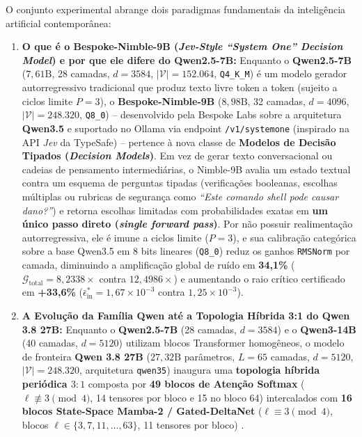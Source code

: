 \documentclass[11pt,a4paper]{article}
\theoremstyle{definition}
\begin{document}
O conjunto experimental abrange dois paradigmas fundamentais da inteligência artificial contemporânea:
\begin{enumerate}
    \item \textbf{O que é o Bespoke-Nimble-9B (\textit{Jev-Style ``System One'' Decision Model}) e por que ele difere do Qwen2.5-7B:} Enquanto o \textbf{Qwen2.5-7B} ($7{,}61\text{B}$, 28 camadas, $d=3584$, $|\mathcal{V}|=152.064$, \texttt{Q4\_K\_M}) é um modelo gerador autorregressivo tradicional que produz texto livre token a token (sujeito a ciclos limite $P=3$), o \textbf{Bespoke-Nimble-9B} ($8{,}98\text{B}$, 32 camadas, $d=4096$, $|\mathcal{V}|=248.320$, \texttt{Q8\_0}) -- desenvolvido pela Bespoke Labs sobre a arquitetura \textbf{Qwen3.5} e suportado no Ollama via endpoint \texttt{/v1/systemone} (inspirado na API \textit{Jev} da TypeSafe) \cite{ollama_jev2026} -- pertence à nova classe de \textbf{Modelos de Decisão Tipados (\textit{Decision Models})}. Em vez de gerar texto conversacional ou cadeias de pensamento intermediárias, o Nimble-9B avalia um estado textual contra um esquema de perguntas tipadas (verificações booleanas, escolhas múltiplas ou rubricas de segurança como \textit{``Este comando shell pode causar dano?''}) e retorna escolhas limitadas com probabilidades exatas em \textbf{um único passo direto (\textit{single forward pass})}. Por não possuir realimentação autorregressiva, ele é imune a ciclos limite ($P=3$), e sua calibração categórica sobre a base Qwen3.5 em 8 bits lineares (\texttt{Q8\_0}) reduz os ganhos \texttt{RMSNorm} por camada, diminuindo a amplificação global de ruído em \textbf{34,1\%} ($\mathcal{G}_{\text{total}} = 8{,}2338\times$ contra $12{,}4986\times$) e aumentando o raio crítico certificado em \textbf{+33,6\%} ($\bar{\epsilon}_{\text{in}}^* = 1{,}67 \times 10^{-3}$ contra $1{,}25 \times 10^{-3}$).
    \item \textbf{A Evolução da Família Qwen até a Topologia Híbrida 3:1 do Qwen 3.8 27B:} Enquanto o \textbf{Qwen2.5-7B} (28 camadas, $d=3584$) e o \textbf{Qwen3-14B} (40 camadas, $d=5120$) utilizam blocos Transformer homogêneos, o modelo de fronteira \textbf{Qwen 3.8 27B} ($27{,}32\text{B}$ parâmetros, $L=65$ camadas, $d=5120$, $|\mathcal{V}|=248.320$, arquitetura \texttt{qwen35}) inaugura uma \textbf{topologia híbrida periódica $3:1$} composta por \textbf{49 blocos de Atenção Softmax} ($\ell \not\equiv 3 \pmod 4$, 14 tensores por bloco e 15 no bloco 64) intercalados com \textbf{16 blocos State-Space Mamba-2 / Gated-DeltaNet} ($\ell \equiv 3 \pmod 4$, blocos $\ell \in \{3, 7, 11, \dots, 63\}$, 11 tensores por bloco) \cite{dao2024,qwen2025}.
\end{enumerate}
\end{document}
